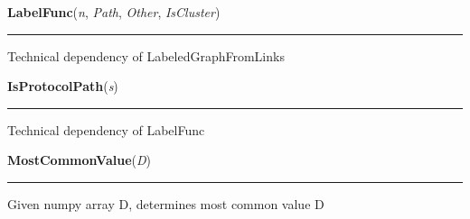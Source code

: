     \label{System:SystemGraphOperations:LabelFunc}

    \vspace{0.5ex}

\hspace{.8\funcindent}\begin{boxedminipage}{\funcwidth}

    \raggedright \textbf{LabelFunc}(\textit{n}, \textit{Path}, \textit{Other}, \textit{IsCluster})

    \vspace{-1.5ex}

    \rule{\textwidth}{0.5\fboxrule}
\setlength{\parskip}{2ex}
    Technical dependency of LabeledGraphFromLinks

\setlength{\parskip}{1ex}
    \end{boxedminipage}

    \label{System:SystemGraphOperations:IsProtocolPath}

    \vspace{0.5ex}

\hspace{.8\funcindent}\begin{boxedminipage}{\funcwidth}

    \raggedright \textbf{IsProtocolPath}(\textit{s})

    \vspace{-1.5ex}

    \rule{\textwidth}{0.5\fboxrule}
\setlength{\parskip}{2ex}
    Technical dependency of LabelFunc

\setlength{\parskip}{1ex}
    \end{boxedminipage}

    \label{System:SystemGraphOperations:MostCommonValue}

    \vspace{0.5ex}

\hspace{.8\funcindent}\begin{boxedminipage}{\funcwidth}

    \raggedright \textbf{MostCommonValue}(\textit{D})

    \vspace{-1.5ex}

    \rule{\textwidth}{0.5\fboxrule}
\setlength{\parskip}{2ex}
    Given numpy array D, determines most common value D

\setlength{\parskip}{1ex}
    \end{boxedminipage}

